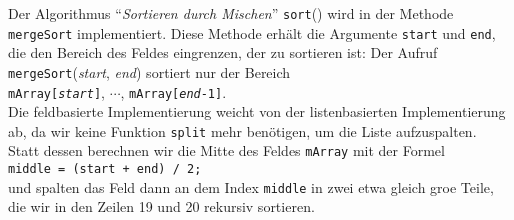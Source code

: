 Der Algorithmus ``\emph{Sortieren durch Mischen}'' \texttt{sort}() wird in der Methode
\texttt{mergeSort} implementiert.  Diese Methode erh\"alt die Argumente  \texttt{start} und
\texttt{end}, die den  Bereich des Feldes eingrenzen, der zu sortieren ist: 
Der Aufruf \texttt{mergeSort}(\textsl{start}, \textsl{end}) sortiert nur der Bereich \\[0.1cm]
\hspace*{1.3cm} \texttt{mArray[\textsl{start}]}, $\cdots$, \texttt{mArray[\textsl{end}-1]}. \\[0.1cm]
Die feldbasierte Implementierung  weicht von der listenbasierten Implementierung ab, da
wir keine Funktion \texttt{split} mehr ben\"otigen, um die Liste aufzuspalten. 
Statt dessen berechnen wir die Mitte des Feldes
\texttt{mArray} mit der Formel \\[0.1cm]
\hspace*{1.3cm} \texttt{middle = (start + end) / 2;} \\[0.1cm]
und spalten das Feld dann an dem Index \texttt{middle} in zwei etwa gleich gro\3e
Teile, die wir in den Zeilen 19 und 20 rekursiv sortieren.

